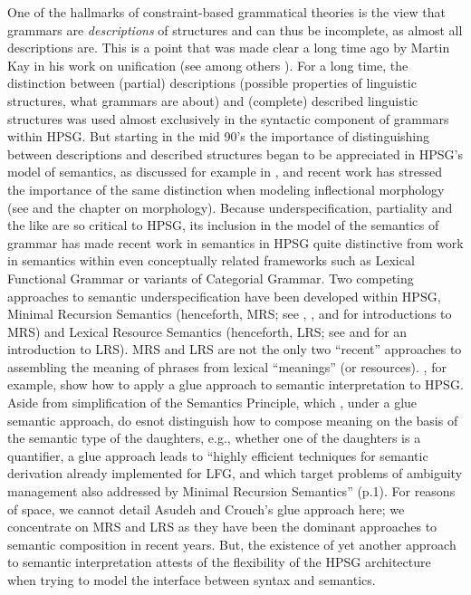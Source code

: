 \documentclass[output=paper]{langsci/langscibook}
\begin{document}
One of the hallmarks of constraint-based grammatical theories is the view that grammars are \emph{descriptions} of structures and can thus be incomplete, as almost all descriptions are. This is a point that was made clear a long time ago by Martin Kay in his work on unification (see among others \citealt{Kay1979}). For a long time, the distinction between (partial) descriptions (possible properties of linguistic structures, what grammars are about) and (complete) described linguistic structures was used almost exclusively in the syntactic component of grammars within HPSG. But starting in the mid 90's the importance of distinguishing between descriptions and described structures began to be appreciated in HPSG's model of semantics, as discussed for example in \citet{Copestakeetal1995}, and recent work has stressed the importance of the same distinction when modeling inflectional morphology (see \citet{CrysmannandBonami2016} and the chapter on morphology). Because underspecification, partiality and the like are so critical to HPSG, its inclusion in the model of the semantics of grammar has made recent work in semantics in HPSG quite distinctive from work in semantics within even conceptually related frameworks such as Lexical Functional Grammar or variants of Categorial Grammar. Two competing approaches to semantic underspecification have been developed within HPSG, Minimal Recursion Semantics (henceforth, MRS; see \citealt{Copestakeetal1995}, \citealt{Copestakeetal2001}, and \citealt{Copestakeetal2005} for introductions to MRS) and Lexical Resource Semantics (henceforth, LRS; see \citealt{RichterandSailer2001,RichterandSailer2004} and \citealt{IordachioaiaRichter.2015} for an introduction to LRS). MRS and LRS are not the only two ``recent'' approaches  to assembling the meaning of phrases from lexical ``meanings'' (or resources). \citet{AsudehandCrouch2002}, for example, show how to apply a glue approach to semantic interpretation to HPSG. Aside from simplification of the Semantics Principle, which , under a glue semantic approach, do esnot distinguish how to compose meaning on the basis of the semantic type of the daughters, e.g., whether one of the daughters is a quantifier, a glue approach leads to ``highly efficient techniques for semantic derivation already implemented for LFG, and which target problems of ambiguity management also addressed by Minimal Recursion Semantics'' (p.1). For reasons of space, we cannot detail Asudeh and Crouch's glue approach here; we concentrate on MRS and LRS as they have been the dominant approaches to semantic composition in recent years. But, the existence of yet another approach to semantic interpretation attests of the flexibility of the HPSG architecture when trying to model the interface between syntax and semantics.
\end{document}
